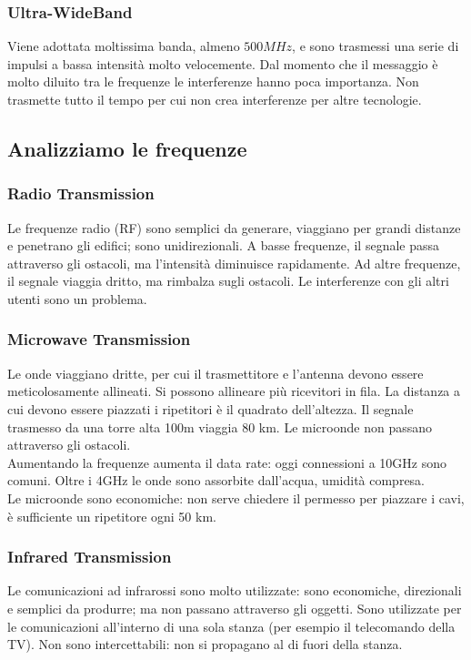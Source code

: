 \documentclass{article}
\begin{document}
\subsubsection{Ultra-WideBand}
Viene adottata moltissima banda, almeno $500MHz$, e sono trasmessi una serie di
impulsi a bassa intensità molto velocemente. Dal momento che il messaggio è
molto diluito tra le frequenze le interferenze hanno poca importanza. Non
trasmette tutto il tempo per cui non crea interferenze per altre tecnologie.

\subsection{Analizziamo le frequenze}

\subsubsection{Radio Transmission}
Le frequenze radio (RF) sono semplici da generare, viaggiano per grandi distanze
e penetrano gli edifici; sono unidirezionali. A basse frequenze, il segnale
passa attraverso gli ostacoli, ma l'intensità diminuisce rapidamente. Ad altre
frequenze, il segnale viaggia dritto, ma rimbalza sugli ostacoli. Le
interferenze con gli altri utenti sono un problema.

\subsubsection{Microwave Transmission}
Le onde viaggiano dritte, per cui il trasmettitore e l'antenna devono essere
meticolosamente allineati. Si possono allineare più ricevitori in fila. La
distanza a cui devono essere piazzati i ripetitori è il quadrato dell'altezza.
Il segnale trasmesso da una torre alta 100m viaggia 80 km. Le microonde non
passano attraverso gli ostacoli.\\
Aumentando la frequenze aumenta il data rate: oggi connessioni a 10GHz sono
comuni. Oltre i 4GHz le onde sono assorbite dall'acqua, umidità compresa.\\
Le microonde sono economiche: non serve chiedere il permesso per piazzare i
cavi, è sufficiente un ripetitore ogni 50 km.

\subsubsection{Infrared Transmission}
Le comunicazioni ad infrarossi sono molto utilizzate: sono economiche,
direzionali e semplici da produrre; ma non passano attraverso gli oggetti. Sono
utilizzate per le comunicazioni all'interno di una sola stanza (per esempio il
telecomando della TV). Non sono intercettabili: non si propagano al di fuori
della stanza.
\end{document}
